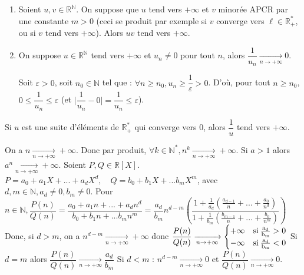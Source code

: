 \documentclass[12pt,a4paper]{report}
\begin{document}
\begin{remarque}
\begin{enumerate}
\item Soient $u,v\in \mathbb{R}^\mathbb{N}$. On suppose que $u$ tend vers $+\infty$ et $v$ minorée APCR par une constante $m > 0$ (ceci se produit par exemple si $v$ converge vers $\ell \in \mathbb{R}^*_+$, ou si $v$ tend vers $+\infty$). Alors $uv$ tend vers $+\infty$.


\item On suppose $u \in \mathbb{R}^\mathbb{N}$ tend vers $+\infty$ et $u_n \neq 0$ pour tout $n$, alors $\dfrac{1}{u_n} \xrightarrow[n \rightarrow +\infty]{} 0$.
\begin{demo}
Soit $\varepsilon > 0$, soit $n_0 \in \mathbb{N}$ tel que : $\forall n \geq n_0, u_n \geq \dfrac{1}{\varepsilon} > 0$. D'où, pour tout $n \geq n_0$, $0 \leq \dfrac{1}{u_n} \leq \varepsilon$ (et $\lvert \dfrac{1}{u_n}-0 \rvert = \dfrac{1}{u_n} \leq \varepsilon$).
\end{demo} 
\end{enumerate}
\end{remarque}

\begin{remarque}
Si $u$ est une suite d'éléments de $\mathbb{R}^*_+$ qui converge vers $0$, alors $\dfrac{1}{u}$ tend vers $+\infty$.
\end{remarque}


\begin{exemple}
On a $n \xrightarrow[n \rightarrow +\infty]{} +\infty$. Donc par produit, $\forall k \in \mathbb{N}^*, n^k \xrightarrow[n \rightarrow +\infty]{} +\infty$.
\newline Si $a > 1$ alors $a^n \xrightarrow[n \rightarrow +\infty]{} +\infty$.
\newline \newline Soient $P,Q \in \mathbb{R}\left[X\right]$. $P = a_0 + a_1 X+...+a_dX^d, \quad Q = b_0 + b_1 X + ... b_m X^m$, avec $d,m \in \mathbb{N}, a_d \neq 0, b_m \neq 0$.
\newline Pour $n \in \mathbb{N}, \dfrac{P(n)}{Q(n)} = \dfrac{a_0 + a_1 n + ... + a_d n^d}{b_0 + b_1 n + ... b_m n^m} = \dfrac{a_d}{b_m}n^{d-m}\left(\dfrac{1+\frac{1}{a_d}\left(\frac{a_{d-1}}{n}+...+\frac{a_0}{n^d}\right)}{1+\frac{1}{b_m}\left(\frac{b_{m-1}}{n}+...+ \frac{b_0}{n^m}\right)}\right)$
\newline \newline Donc, si $d > m$, on a $n^{d-m} \xrightarrow[n \rightarrow +\infty]{} +\infty$
\newline donc $\dfrac{P(n)}{Q(n)} \xrightarrow[n \rightarrow +\infty]{} 
\begin{cases}
+\infty & \rm{si } \: \frac{a_d}{b_m} > 0 \\
-\infty & \rm{si } \: \frac{a_d}{b_m} < 0
\end{cases}$
\newline Si $d=m$ alors $\dfrac{P(n)}{Q(n)} \xrightarrow[n \rightarrow +\infty]{}\dfrac{a_d}{b_m}$
\newline Si $d<m$ : $n^{d-m} \xrightarrow[n \rightarrow +\infty]{} 0$ et $\dfrac{P(n)}{Q(n)} \xrightarrow[n \rightarrow +\infty]{} 0$.
\end{exemple}
\end{document}
